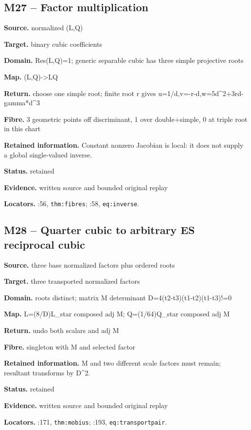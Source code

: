 \subsection*{M27 -- Factor multiplication}
\noindent\textbf{Source.} normalized (L,Q)\par
\noindent\textbf{Target.} binary cubic coefficients\par
\noindent\textbf{Domain.} Res(L,Q)=1; generic separable cubic has three simple projective roots\par
\noindent\textbf{Map.} (L,Q)->LQ\par
\noindent\textbf{Return.} choose one simple root; finite root r gives u=1/d,v=-r-d,w=5d\textasciicircum{}2+3rd-gamma*d\textasciicircum{}3\par
\noindent\textbf{Fibre.} 3 geometric points off discriminant, 1 over double+simple, 0 at triple root in this chart\par
\noindent\textbf{Retained information.} Constant nonzero Jacobian is local: it does not supply a global single-valued inverse.\par
\noindent\textbf{Status.} retained\par
\noindent\textbf{Evidence.} written source and bounded original replay\par
\noindent\textbf{Locators.} :56, \texttt{thm:fibres}; :58, \texttt{eq:inverse}.
\subsection*{M28 -- Quarter cubic to arbitrary ES reciprocal cubic}
\noindent\textbf{Source.} three base normalized factors plus ordered roots\par
\noindent\textbf{Target.} three transported normalized factors\par
\noindent\textbf{Domain.} roots distinct; matrix M determinant D=4(t2-t3)(t1-t2)(t1-t3)!=0\par
\noindent\textbf{Map.} L=(8/D)L\_star composed adj M; Q=(1/64)Q\_star composed adj M\par
\noindent\textbf{Return.} undo both scalars and adj M\par
\noindent\textbf{Fibre.} singleton with M and selected factor\par
\noindent\textbf{Retained information.} M and two different scale factors must remain; resultant transforms by D\textasciicircum{}2.\par
\noindent\textbf{Status.} retained\par
\noindent\textbf{Evidence.} written source and bounded original replay\par
\noindent\textbf{Locators.} :171, \texttt{thm:mobius}; :193, \texttt{eq:transportpair}.
